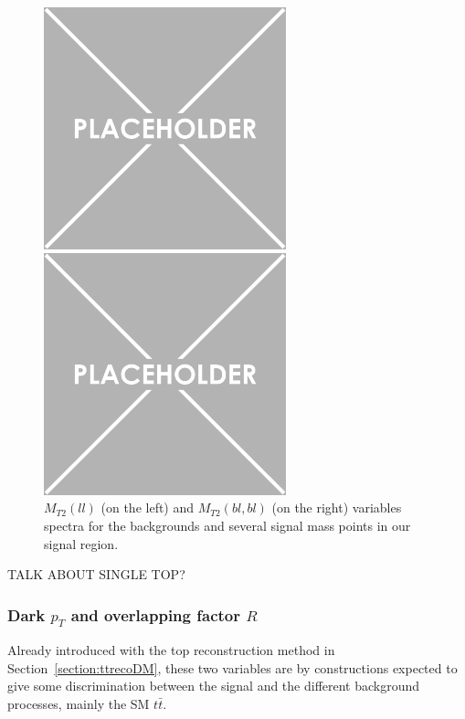 \documentclass[a4paper, 10pt, openright]{report}
\begin{document}
\begin{figure}[htbp]
\centering
\begin{minipage}[b]{.48\textwidth}
\includegraphics[width=7cm, height=7cm]{figs/placeholder.png}
\end{minipage}\hfill
\begin{minipage}[b]{.48\textwidth}
\includegraphics[width=7cm, height=7cm]{figs/placeholder.png}
\end{minipage} \hfill
\caption{$M_{T2}(ll)$ (on the left) and $M_{T2}(bl, bl)$ (on the right) variables spectra for the backgrounds and several signal mass points in our signal region.}
\label{fig:SRdiscMET}
\end{figure}

\color{red} TALK ABOUT SINGLE TOP? \color{black}

\subsubsection*{Dark $p_T$ and overlapping factor $R$}

Already introduced with the top reconstruction method in Section~\ref{section:ttrecoDM}, these two variables are by constructions expected to give some discrimination between the signal and the different background processes, mainly the \ac{SM} $t \bar t$. 
\end{document}
